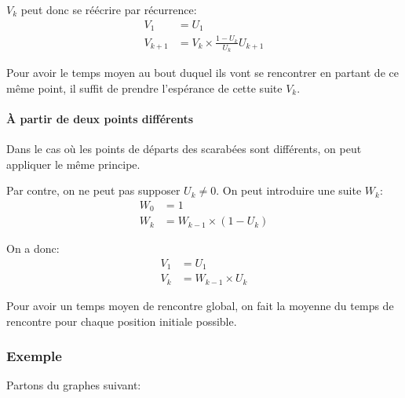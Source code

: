       $V_k$ peut donc se réécrire par récurrence:
        \begin{align*}
          V_1       &= U_1 \\
          V_{k + 1} &= V_k \times \frac{1 - U_k}{U_k}U_{k + 1}
        \end{align*}

      Pour avoir le temps moyen au bout duquel ils vont se rencontrer en
      partant de ce même point, il suffit de prendre l'espérance de cette suite
      $V_k$.

    \paragraph{À partir de deux points différents}
      Dans le cas où les points de départs des scarabées sont différents, on peut
      appliquer le même principe.

      Par contre, on ne peut pas supposer $U_k \neq 0$. %
      On peut introduire une suite $W_k$: %
      \begin{align*}
        W_0 &= 1 \\
        W_k &= W_{k-1} \times (1 - U_k)
      \end{align*}

      On a donc:
      \begin{align*}
        V_1  &= U_1 \\
        V_k &= W_{k-1} \times U_k
      \end{align*}

      Pour avoir un temps moyen de rencontre global, on fait la moyenne du temps
      de rencontre pour chaque position initiale possible.

  \subsubsection{Exemple}
    Partons du graphes suivant:
    \begin{center}
    \end{center}


